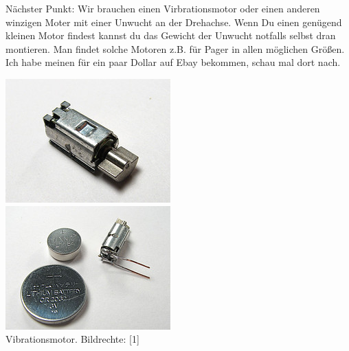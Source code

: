 \documentclass[10pt,a4paper,ngerman,twoside]{article} %
\begin{document}
\begin{multicols}{3}
Nächster Punkt: Wir brauchen einen Virbrationsmotor oder einen anderen winzigen Moter mit einer Unwucht an der Drehachse. Wenn Du einen genügend kleinen Motor findest kannst du das Gewicht der Unwucht notfalls selbst dran montieren. Man findet solche Motoren z.B. für Pager in allen möglichen Größen. Ich habe meinen für ein paar Dollar auf Ebay bekommen, schau mal dort nach.
\\
\begin{center}
\includegraphics[width=\linewidth]{bristlebot/bristlebot6.jpg}\\
\includegraphics[width=\linewidth]{bristlebot/bristlebot7.jpg}\\
\footnotesize{Vibrationsmotor. Bildrechte: [1]}
\end{center}


\end{multicols}
\end{document}
